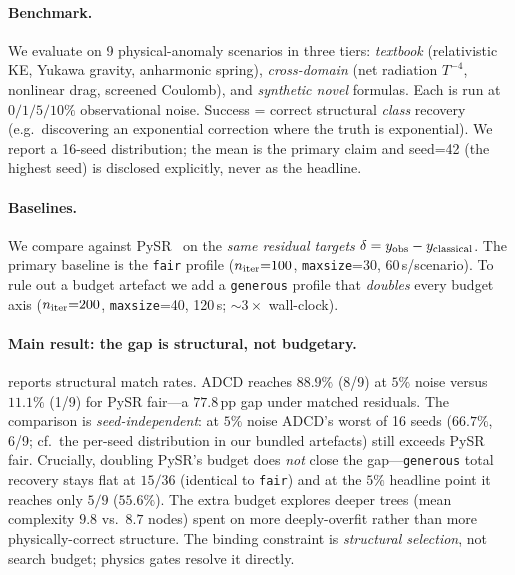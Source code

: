 \documentclass{article}
\begin{document}
\paragraph{Benchmark.}
We evaluate on 9 physical-anomaly scenarios in three tiers: \emph{textbook} (relativistic KE, Yukawa gravity, anharmonic spring), \emph{cross-domain} (net radiation $T^{-4}$, nonlinear drag, screened Coulomb), and \emph{synthetic novel} formulas. Each is run at $0/1/5/10\%$ observational noise. Success = correct structural \emph{class} recovery (e.g.\ discovering an exponential correction where the truth is exponential). We report a 16-seed distribution; the mean is the primary claim and seed=42 (the highest seed) is disclosed explicitly, never as the headline.

\paragraph{Baselines.}
We compare against PySR~\cite{cranmer2020pysr} on the \emph{same residual targets} $\delta=y_{\rm obs}-y_{\rm classical}$. The primary baseline is the \texttt{fair} profile ($n_{\rm iter}{=}100$, \texttt{maxsize}{=}30, 60\,s/scenario). To rule out a budget artefact we add a \texttt{generous} profile that \emph{doubles} every budget axis ($n_{\rm iter}{=}200$, \texttt{maxsize}{=}40, 120\,s; $\sim3\times$ wall-clock).

\paragraph{Main result: the gap is structural, not budgetary.}
 reports structural match rates. ADCD reaches $88.9\%$ (8/9) at $5\%$ noise versus $11.1\%$ (1/9) for PySR fair---a $77.8$\,pp gap under matched residuals. The comparison is \emph{seed-independent}: at $5\%$ noise ADCD's worst of 16 seeds ($66.7\%$, 6/9; cf.\ the per-seed distribution in our bundled artefacts) still exceeds PySR fair. Crucially, doubling PySR's budget does \emph{not} close the gap---\texttt{generous} total recovery stays flat at $15/36$ (identical to \texttt{fair}) and at the $5\%$ headline point it reaches only $5/9$ ($55.6\%$). The extra budget explores deeper trees (mean complexity $9.8$ vs.\ $8.7$ nodes) spent on more deeply-overfit rather than more physically-correct structure. The binding constraint is \emph{structural selection}, not search budget; physics gates resolve it directly.
\end{document}
